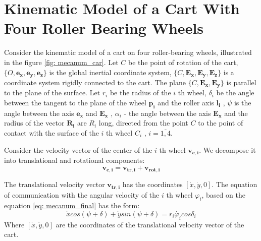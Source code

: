 \documentclass[oneside,final,14pt]{extreport}
\newcommand{\cmmnt}[1]{\ignorespaces}
\newcommand{\bs}{\boldsymbol}
\begin{document}
\chapter{Kinematic Model of a Cart With Four Roller Bearing Wheels}
Consider the kinematic model of a cart on four roller-bearing wheels, illustrated in the figure \ref{fig: mecanum_car}. Let $ C $ be the point of rotation of the cart, $ \{O, \bs{e_{x}}, \bs{e_{y}}, \bs{e_{z}} \} $ is the global inertial coordinate system, $ \{C, \bs{E_{x}}, \bs{E_{y}}, \bs{E_{z}} \} $ is a coordinate system rigidly connected to the cart. The plane $ \{C, \bs{E_{x}}, \bs{E_{y}} \} $ is parallel to the plane of the surface. Let $ r_{i} $ be the radius of the $ i $ th wheel, $ \delta_{i} $ be the angle between the tangent to the plane of the wheel $ \bs{p_{i}} $ and the roller axis $ \bs{l_{i }} $ \cmmnt{, $ \delta_{i} = \widehat{p_{i} l_{i}} $}, $ \psi $ is the angle between the axis $ \bs{e_{x}} $ and $ \bs{E_{x}} $ \cmmnt{, $ \psi $ = $ \widehat{e_{x} E{x}} $}, $ \alpha_{i} $ - the angle between the axis $ \bs{E_{ x}} $ and the radius of the vector $ \bs{R_{i}} $ are $ R_{i} $ long, directed from the point $ C $ to the point of contact with the surface of the $ i $ th wheel $ C_{i} $ \cmmnt{, $ \alpha_{i} = \widehat{E_{x} \overrightarrow{C C_{i}}} $}, $ i = \overline{1,4} $.

\begin{figure} [H]
\end{figure}

Consider the velocity vector of the center of the $ i $ th wheel $ \bs{v_{c, i}} $. We decompose it into translational and rotational components:
\begin{equation}
\label{eq: mec_wheel_v_decomp}
\bs{v_{c, i}}
=
\bs{v_{tr, i}}
+
\bs{v_{rot, i}}
\end{equation}

The translational velocity vector $ \bs{v_{tr, i}} $ has the coordinates $ [\dot{x}, \dot{y}, 0] $. The equation of communication with the angular velocity of the $ i $ th wheel $ \varphi_{i} $, based on the equation \ref{eq: mecanum_final} has the form:
\begin{equation}
\dot{x}
cos (\psi + \delta)
+
\dot{y}
sin (\psi + \delta)
=
r_{i} \dot{\varphi_{i}}
cos \delta_{i}
\end{equation}
Where $ [\dot{x}, \dot{y}, 0] $ are the coordinates of the translational velocity vector of the cart.
\end{document}
